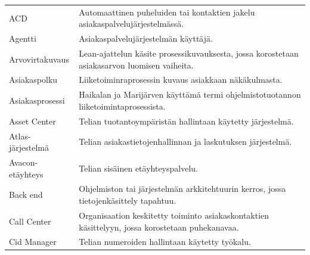 \documentclass[finnish,12pt,a4paper,pdftex]{article}
\begin{document}
\begin{table}[h!]
\centering
\label{my-label}

\begin{tabular}{ p{5cm}  p{\textwidth-6cm} }
ACD                         & Automaattinen puheluiden tai kontaktien jakelu asiakaspalvelujärjestelmässä.                                                                      \\ [0.9em]
Agentti                     & Asiakaspalvelujärjestelmän käyttäjä.                                                                                                              \\[0.9em]
Arvovirtakuvaus             & Lean-ajattelun käsite prosessikuvauksesta, jossa korostetaan asiakasarvon luomisen vaiheita.                                                     \\[0.9em]
Asiakaspolku                & Liiketoiminraprosessin kuvaus asiakkaan näkäkulmasta.                                                                                            \\[0.9em]
Asiakasprosessi             & Haikalan ja Marijärven \citeyearpar{ohjelmistotuotanto} käyttämä termi ohjelmistotuotannon liiketoimintaprosessista.                                                       \\[0.9em]
Asset Center                & Telian tuotantoympäristän hallintaan käytetty järjestelmä.                                                                                       \\[0.9em]
Atlas-järjestelmä           & Telian asiakastietojenhallinnan ja laskutuksen järjestelmä.                                                                                                                                             \\[0.9em]
Avacon-etäyhteys            & Telian sisäinen etäyhteyspalvelu.                                                                                                                                                 \\[0.9em]
Back end                    & Ohjelmiston tai järjestelmän arkkitehtuurin kerros, jossa tietojenkäsittely tapahtuu.                                                            \\[0.9em]
Call Center                 & Organisaation keskitetty toiminto asiakaskontaktien käsittelyyn, jossa korostetaan puhekanavaa.                                                  \\[0.9em]
Cid Manager                 & Telian numeroiden hallintaan käytetty työkalu.                                                                                                   \\[0.9em]

\end{tabular}
\end{table}
\end{document}
